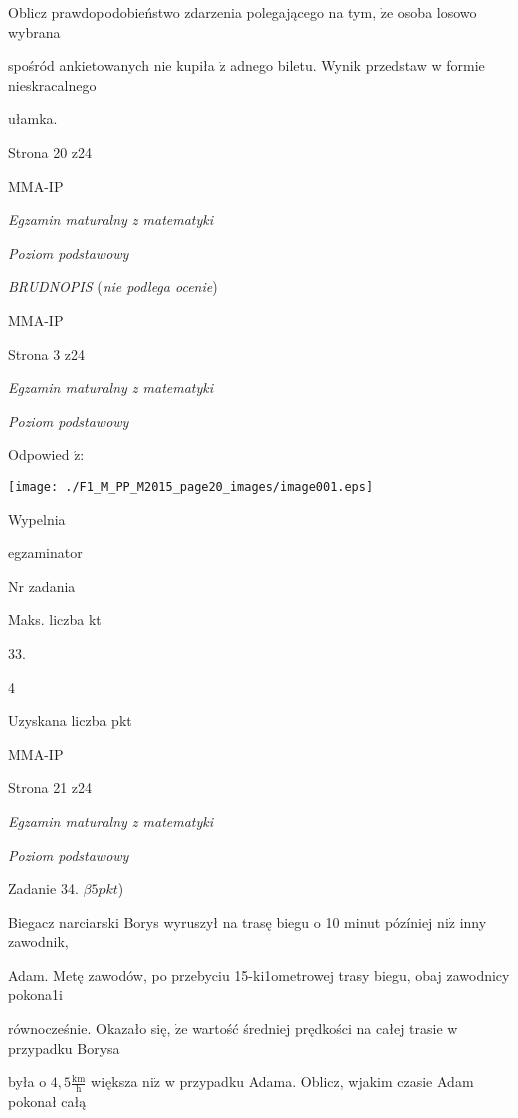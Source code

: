 \documentclass[a4paper,12pt]{article}
\begin{document}
Oblicz prawdopodobieństwo zdarzenia polegającego na tym, $\dot{\mathrm{z}}\mathrm{e}$ osoba losowo wybrana

spośród ankietowanych nie kupiła $\dot{\mathrm{z}}$ adnego biletu. Wynik przedstaw w formie nieskracalnego

ułamka.

Strona 20 z24

MMA-IP





{\it Egzamin maturalny z matematyki}

{\it Poziom podstawowy}

{\it BRUDNOPIS} ({\it nie podlega ocenie})

MMA-IP

Strona 3 z24





{\it Egzamin maturalny z matematyki}

{\it Poziom podstawowy}

Odpowied $\acute{\mathrm{z}}$:
\begin{center}
\texttt{[image: ./F1\_M\_PP\_M2015\_page20\_images/image001.eps]}
\end{center}
Wypelnia

egzaminator

Nr zadania

Maks. liczba kt

33.

4

Uzyskana liczba pkt

MMA-IP

Strona 21 z24





{\it Egzamin maturalny z matematyki}

{\it Poziom podstawowy}

Zadanie 34. $\beta 5pkt$)

Biegacz narciarski Borys wyruszył na trasę biegu o 10 minut pózíniej $\mathrm{n}\mathrm{i}\dot{\mathrm{z}}$ inny zawodnik,

Adam. Metę zawodów, po przebyciu 15-ki1ometrowej trasy biegu, obaj zawodnicy pokona1i

równocześnie. Okazało się, $\dot{\mathrm{z}}\mathrm{e}$ wartość średniej prędkości na całej trasie w przypadku Borysa

była o $4,5 \displaystyle \frac{\mathrm{k}\mathrm{m}}{\mathrm{h}}$ większa $\mathrm{n}\mathrm{i}\dot{\mathrm{z}}$ w przypadku Adama. Oblicz, wjakim czasie Adam pokonał całą
\end{document}
